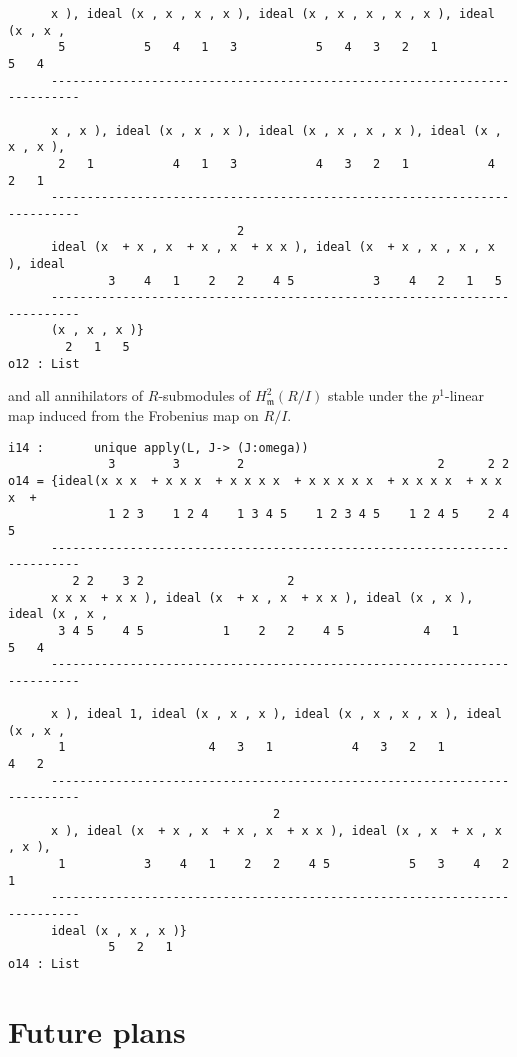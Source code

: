 \documentclass[11pt]{amsart}
\begin{document}
\begin{example}
\begin{verbatim}
      x ), ideal (x , x , x , x ), ideal (x , x , x , x , x ), ideal (x , x ,
       5           5   4   1   3           5   4   3   2   1           5   4
      --------------------------------------------------------------------------

      x , x ), ideal (x , x , x ), ideal (x , x , x , x ), ideal (x , x , x ),
       2   1           4   1   3           4   3   2   1           4   2   1
      --------------------------------------------------------------------------
                                2
      ideal (x  + x , x  + x , x  + x x ), ideal (x  + x , x , x , x ), ideal
              3    4   1    2   2    4 5           3    4   2   1   5
      --------------------------------------------------------------------------
      (x , x , x )}
        2   1   5
o12 : List
\end{verbatim}
and all annihilators of $R$-submodules of $H^2_{\mathfrak{m}} (R/I)$ stable under the $p^1$-linear map induced from the Frobenius map on $R/I$.
\begin{verbatim}
i14 :       unique apply(L, J-> (J:omega))
              3        3        2                           2      2 2
o14 = {ideal(x x x  + x x x  + x x x x  + x x x x x  + x x x x  + x x x  +
              1 2 3    1 2 4    1 3 4 5    1 2 3 4 5    1 2 4 5    2 4 5
      --------------------------------------------------------------------------
         2 2    3 2                    2
      x x x  + x x ), ideal (x  + x , x  + x x ), ideal (x , x ), ideal (x , x ,
       3 4 5    4 5           1    2   2    4 5           4   1           5   4
      --------------------------------------------------------------------------

      x ), ideal 1, ideal (x , x , x ), ideal (x , x , x , x ), ideal (x , x ,
       1                    4   3   1           4   3   2   1           4   2
      --------------------------------------------------------------------------
                                     2
      x ), ideal (x  + x , x  + x , x  + x x ), ideal (x , x  + x , x , x ),
       1           3    4   1    2   2    4 5           5   3    4   2   1
      --------------------------------------------------------------------------
      ideal (x , x , x )}
              5   2   1
o14 : List
\end{verbatim}

\end{example}

\section{Future plans}
\end{document}
